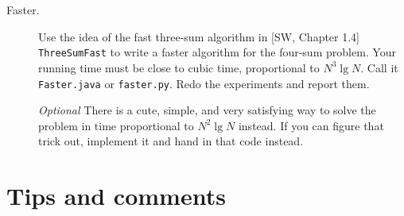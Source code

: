 \documentclass{tufte-handout}
\begin{document}
\begin{description}
\item[Faster.]
  Use the idea of the fast three-sum algorithm in [SW, Chapter 1.4] \texttt{
  ThreeSumFast} to write a faster algorithm for the four-sum problem.
  Your running time must be close to cubic time, proportional to $N^3\operatorname{lg} N$.
  Call it \texttt{Faster.java}  or \texttt{faster.py}.
  Redo the experiments and report them.

  \emph{Optional} There is a cute, simple, and very satisfying way to solve the problem in time proportional to $N^2\operatorname{lg} N$ instead.
If you can figure that trick out, implement it and hand in that code instead.
\end{description}

\section{Tips and comments}
\end{document}
